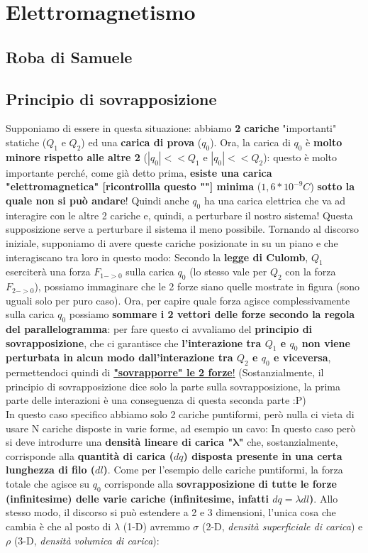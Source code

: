 \section{Elettromagnetismo}

    \subsection{Roba di Samuele}


    \subsection{Principio di sovrapposizione}
        Supponiamo di essere in questa situazione: abbiamo \textbf{2 cariche} "importanti" statiche ($Q_1$ e $Q_2$) ed una \textbf{carica di prova} ($q_0$). Ora, la carica di $q_0$ è \textbf{molto minore rispetto alle altre 2} ($|q_0|<<Q_1$ e $|q_0|<<Q_2$): questo è molto importante perché, come già detto prima, \textbf{esiste una carica "elettromagnetica" [ricontrollla questo ""] minima} ($1,6*10^{-9}C$) \textbf{sotto la quale non si può andare}! Quindi anche $q_0$ ha una carica elettrica che va ad interagire con le altre 2 cariche e, quindi, a perturbare il nostro sistema! Questa supposizione serve a perturbare il sistema il meno possibile. Tornando al discorso iniziale, supponiamo di avere queste cariche posizionate in su un piano e che interagiscano tra loro in questo modo:
        Secondo la \textbf{legge di Culomb}, $Q_1$ eserciterà una forza $F_{1->0}$ sulla carica $q_0$ (lo stesso vale per $Q_2$ con la forza $F_{2->0}$), possiamo immaginare che le 2 forze siano quelle mostrate in figura (sono uguali solo per puro caso). Ora, per capire quale forza agisce complessivamente sulla carica $q_0$ possiamo \textbf{sommare i 2 vettori delle forze secondo la regola del parallelogramma}: per fare questo ci avvaliamo del \textbf{principio di sovrapposizione}, che ci garantisce che \textbf{l'interazione tra $Q_1$ e $q_0$ non viene perturbata in alcun modo dall'interazione tra $Q_2$ e $q_0$ e viceversa}, permettendoci quindi di \underline{\textbf{"sovrapporre" le 2 forze}!} (Sostanzialmente, il principio di sovrapposizione dice solo la parte sulla sovrapposizione, la prima parte delle interazioni è una conseguenza di questa seconda parte :P) \bigskip\\
        In questo caso specifico abbiamo solo 2 cariche puntiformi, però nulla ci vieta di usare N cariche disposte in varie forme, ad esempio un cavo:
        In questo caso però si deve introdurre una \textbf{densità lineare di carica "$\mathbf{\lambda}$"} che, sostanzialmente, corrisponde alla \textbf{quantità di carica ($dq$) disposta presente in una certa lunghezza di filo ($dl$)}. Come per l'esempio delle cariche puntiformi, la forza totale che agisce su $q_0$ corrisponde alla \textbf{sovrapposizione di tutte le forze (infinitesime) delle varie cariche (infinitesime, infatti $dq = \lambda dl$)}. Allo stesso modo, il discorso si può estendere a 2 e 3 dimensioni, l'unica cosa che cambia è che al posto di $\lambda$ (1-D) avremmo $\sigma$ (2-D, \textit{densità superficiale di carica}) e $\rho$ (3-D, \textit{densità volumica di carica}):

